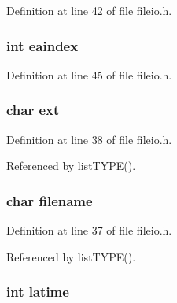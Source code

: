 Definition at line 42 of file fileio.\-h.

\hypertarget{struct_d_i_r_t_a_b_l_e_a0029febe28b2e86b5da78334b335830b}{
\subsubsection[{eaindex}]{\setlength{\rightskip}{0pt plus 5cm}int eaindex}}\label{struct_d_i_r_t_a_b_l_e_a0029febe28b2e86b5da78334b335830b}


Definition at line 45 of file fileio.\-h.

\hypertarget{struct_d_i_r_t_a_b_l_e_ac5896923235fc86c94be4dd54a255c3d}{
\subsubsection[{ext}]{\setlength{\rightskip}{0pt plus 5cm}char ext}}\label{struct_d_i_r_t_a_b_l_e_ac5896923235fc86c94be4dd54a255c3d}


Definition at line 38 of file fileio.\-h.



Referenced by list\-T\-Y\-P\-E().

\hypertarget{struct_d_i_r_t_a_b_l_e_a9c43d1f94c4d6b1f667b553788897f4f}{
\subsubsection[{filename}]{\setlength{\rightskip}{0pt plus 5cm}char filename}}\label{struct_d_i_r_t_a_b_l_e_a9c43d1f94c4d6b1f667b553788897f4f}


Definition at line 37 of file fileio.\-h.



Referenced by list\-T\-Y\-P\-E().

\hypertarget{struct_d_i_r_t_a_b_l_e_a874cb2344d259c44d1053590cade58bf}{
\subsubsection[{latime}]{\setlength{\rightskip}{0pt plus 5cm}int latime}}\label{struct_d_i_r_t_a_b_l_e_a874cb2344d259c44d1053590cade58bf}


